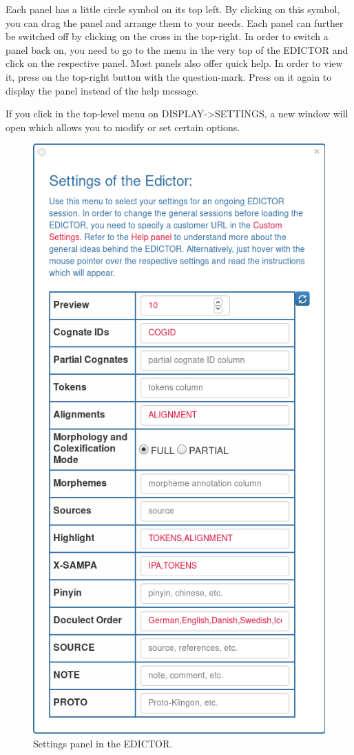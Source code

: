 \documentclass[a4paper,svgnames]{scrartcl}
\begin{document}
Each panel has a little circle symbol on its top left. By clicking on
this symbol, you can drag the panel and arrange them to your needs. Each
panel can further be switched off by clicking on the cross in the
top-right. In order to switch a panel back on, you need to go to the
menu in the very top of the EDICTOR and click on the respective panel.
Most panels also offer quick help. In order to view it, press on the
top-right button with the question-mark. Press on it again to display
the panel instead of the help message.

If you click in the top-level menu on DISPLAY-\textgreater{}SETTINGS, a
new window will open which allows you to modify or set certain options.

\begin{figure}
\centering
\includegraphics{images/figure-6.png}
\caption{Settings panel in the EDICTOR.}
\end{figure}
\end{document}
